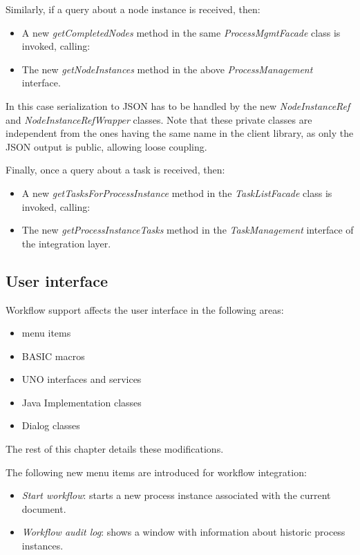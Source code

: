 Similarly, if a query about a node instance is received, then:

\begin{itemize}
\item A new \emph{getCompletedNodes} method in the same \emph{ProcessMgmtFacade} class is invoked, calling:
\item The new \emph{getNodeInstances} method in the above \emph{ProcessManagement} interface.
\end{itemize}

In this case serialization to JSON has to be handled by the new
\emph{NodeInstanceRef} and \emph{NodeInstanceRefWrapper} classes. Note that
these private classes are independent from the ones having the same name in the
client library, as only the JSON output is public, allowing loose coupling.

Finally, once a query about a task is received, then:

\begin{itemize}
\item A new \emph{getTasksForProcessInstance} method in the \emph{TaskListFacade} class is invoked, calling:
\item The new \emph{getProcessInstanceTasks} method in the \emph{TaskManagement} interface of the integration layer.
\end{itemize}

\subsection{User interface}

Workflow support affects the user interface in the following areas:

\begin{itemize}
\item menu items
\item BASIC macros
\item UNO interfaces and services
\item Java Implementation classes
\item Dialog classes
\end{itemize}

The rest of this chapter details these modifications.


The following new menu items are introduced for workflow integration:

\begin{itemize}
\item \emph{Start workflow}: starts a new process instance associated with the current document.
\item \emph{Workflow audit log}: shows a window with information about historic process instances.
\end{itemize}

